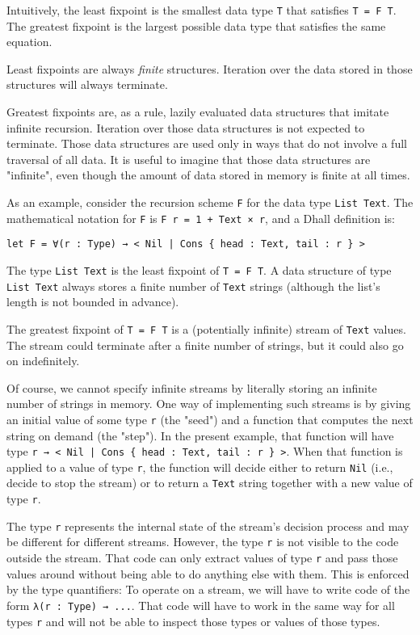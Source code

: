 Intuitively, the least fixpoint is the smallest data type \lstinline!T! that satisfies \lstinline!T = F T!.
The greatest fixpoint is the largest possible data type that satisfies the same equation.


Least fixpoints are always \emph{finite} structures.
Iteration over the data stored in those structures will always terminate.


Greatest fixpoints are, as a rule, lazily evaluated data structures that imitate infinite recursion.
Iteration over those data structures is not expected to terminate.
Those data structures are used only in ways that do not involve a full traversal of all data.
It is useful to imagine that those data structures are "infinite", even though the amount of data stored in memory is finite at all times.


As an example, consider the recursion scheme \lstinline!F! for the data type \lstinline!List Text!.
The mathematical notation for \lstinline!F! is \lstinline!F r = 1 + Text × r!, and a Dhall definition is:


\begin{lstlisting}[language=Dhall]
let F = ∀(r : Type) → < Nil | Cons { head : Text, tail : r } >
\end{lstlisting}


The type \lstinline!List Text! is the least fixpoint of \lstinline!T = F T!.
A data structure of type \lstinline!List Text! always stores a finite number of \lstinline!Text! strings (although the list's length is not bounded in advance).


The greatest fixpoint of \lstinline!T = F T! is a (potentially infinite) stream of \lstinline!Text! values.
The stream could terminate after a finite number of strings, but it could also go on indefinitely.


Of course, we cannot specify infinite streams by literally storing an infinite number of strings in memory.
One way of implementing such streams is by giving an initial value of some type \lstinline!r! (the "seed") and a function that computes the next string on demand (the "step").
In the present example, that function will have type \lstinline!r → < Nil | Cons { head : Text, tail : r } >!.
When that function is applied to a value of type \lstinline!r!, the function will decide either to return \lstinline!Nil! (i.e., decide to stop the stream) or to return a \lstinline!Text! string together with a new value of type \lstinline!r!.


The type \lstinline!r! represents the internal state of the stream's decision process and may be different for different streams.
However, the type \lstinline!r! is not visible to the code outside the stream.
That code can only extract values of type \lstinline!r! and pass those values around without being able to do anything else with them.
This is enforced by the type quantifiers:
To operate on a stream, we will have to write code of the form \lstinline!λ(r : Type) → ...!.
That code will have to work in the same way for all types \lstinline!r! and will not be able to inspect those types or values of those types.


